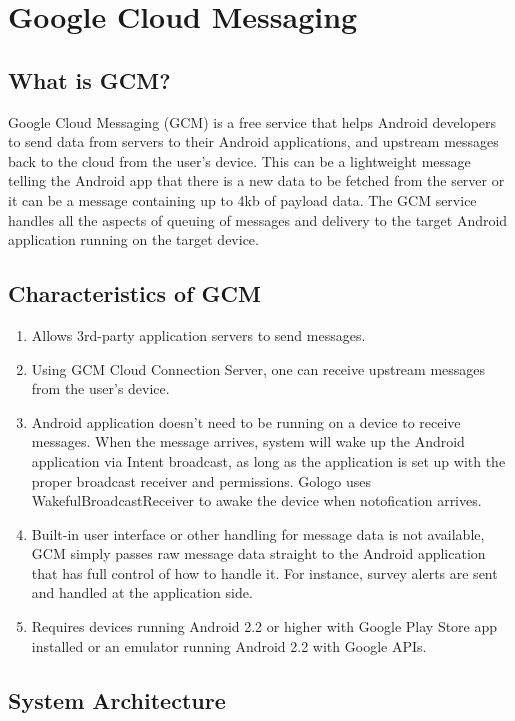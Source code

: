 \chapter {Google Cloud Messaging}
\section{What is GCM?}
Google Cloud Messaging (GCM) is a free service that helps Android developers to send data from servers to their Android applications, and upstream messages back to the cloud from the user’s device. This can be a lightweight message telling the Android app that there is a new data to be fetched from the server or it can be a message containing up to 4kb of payload data. The GCM service handles all the aspects of queuing of messages and delivery to the target Android application running on the target device.

\section{Characteristics of GCM}
\begin {enumerate}

\item    Allows 3rd-party application servers to send messages.
\item  Using GCM Cloud Connection Server, one can receive upstream messages from the user’s device.
\item Android application doesn’t need to be running on a device to receive messages. When the message arrives, system will wake up the Android application via Intent broadcast, as long as the application is set up with the proper broadcast receiver and permissions. Gologo uses WakefulBroadcastReceiver to awake the device when notofication arrives.
\item Built-in user interface or other handling for message data is not available, GCM simply passes raw message data straight to the Android application that has full control of how to handle it. For instance, survey alerts are sent and handled at the application side.
\item Requires devices running Android 2.2 or higher with Google Play Store app installed or an emulator running Android 2.2 with Google APIs.

\end {enumerate}

\section{ System Architecture}

